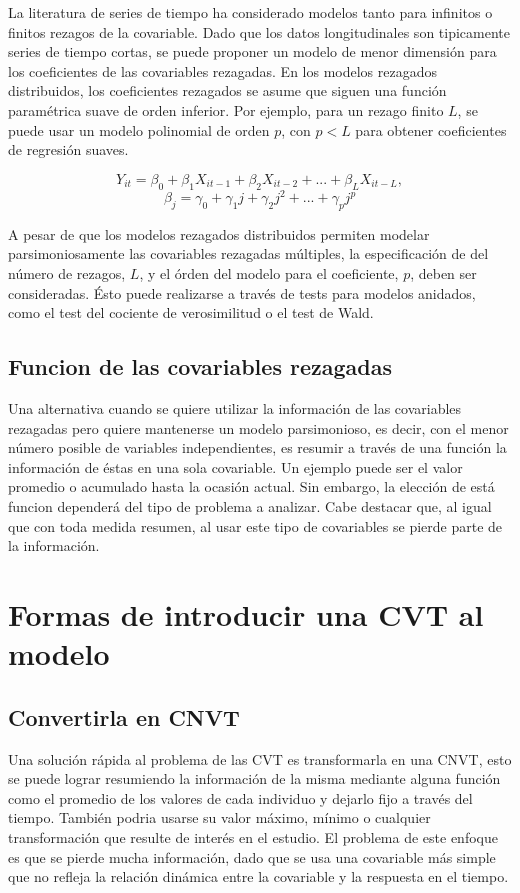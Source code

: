 \documentclass[spanish]{article}
\numberwithin{figure}{subsection}
\numberwithin{equation}{subsection}
\numberwithin{table}{subsection}
\begin{document}
La literatura de series de tiempo ha considerado modelos tanto para infinitos o
finitos rezagos de la covariable. Dado que los datos longitudinales son
tipicamente series de tiempo cortas, se puede proponer un modelo de menor
dimensión para los coeficientes de las covariables rezagadas. En los modelos
rezagados distribuidos, los coeficientes rezagados se asume que siguen una
función paramétrica suave de orden inferior. Por ejemplo, para un rezago finito
$L$, se puede usar un modelo polinomial de orden $p$, con $p < L$ para obtener
coeficientes de regresión suaves.

\[ Y_{it} = \beta_0 + \beta_1 X_{it-1} + \beta_2 X_{it-2} + ... +
\beta_L X_{it-L}, \]
\[ \beta_j = \gamma_0 + \gamma_1 j + \gamma_2 j^2 + ... + \gamma_p j^p \]

A pesar de que los modelos rezagados distribuidos permiten modelar
parsimoniosamente las covariables rezagadas múltiples, la especificación de del
número de rezagos, $L$, y el órden del modelo para el coeficiente, $p$, deben
ser consideradas. Ésto puede realizarse a través de tests para modelos
anidados, como el test del cociente de verosimilitud o el test de Wald.

\subsection{Funcion de las covariables rezagadas}

Una alternativa cuando se quiere utilizar la información de las covariables
rezagadas pero quiere mantenerse un modelo parsimonioso, es decir, con el menor
número posible de variables independientes, es resumir a través de una función
la información de éstas en una sola covariable. Un ejemplo puede ser el valor
promedio o acumulado hasta la ocasión actual. Sin embargo, la elección de está
funcion dependerá del tipo de problema a analizar. Cabe destacar que, al igual
que con toda medida resumen, al usar este tipo de covariables se pierde
parte de la información.

\section{Formas de introducir una CVT al modelo}

\subsection{Convertirla en CNVT}

Una solución rápida al problema de las CVT es transformarla en una CNVT, esto
se puede lograr resumiendo la información de la misma mediante alguna función
como el promedio de los valores de cada individuo y dejarlo fijo a través del
tiempo. También podria usarse su valor máximo, mínimo o cualquier
transformación que resulte de interés en el estudio. El problema de este
enfoque es que se pierde mucha información, dado que se usa una covariable más
simple que no refleja la relación dinámica entre la covariable y la respuesta
en el tiempo.
\end{document}
